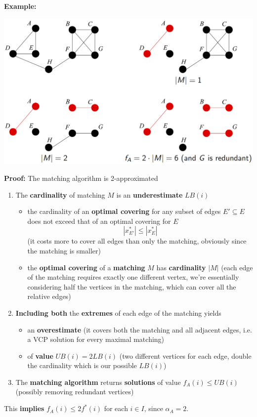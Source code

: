 \documentclass[11pt]{article}
\begin{document}
	\newpage
	
	\textbf{Example:}
	\begin{center}
		\includegraphics[width=\columnwidth]{img/VCP2Approx}
	\end{center}
	
	\textbf{Proof:} The matching algorithm is 2-approximated
	\begin{enumerate}
		\item The \textbf{cardinality} of matching $M$ is an \textbf{underestimate} $LB (i )$
		\begin{itemize}
			\item the cardinality of an \textbf{optimal covering} for any subset of edges $E' \subseteq E$ does not exceed that of an optimal covering for $E$
			$$ |x_{E'}^\ast| \leq |x_E^\ast|$$
			(it costs more to cover all edges than only the matching, obviously since the matching is smaller)
			\item the \textbf{optimal covering} of a \textbf{matching} $M$ has \textbf{cardinality} $|M|$ (each edge of the matching requires exactly one different vertex, we're essentially considering half the vertices in the matching, which can cover all the relative edges)
		\end{itemize}
		\item \textbf{Including both} the \textbf{extremes} of each edge of the matching yields
		\begin{itemize}
			\item an \textbf{overestimate} (it covers both the matching and all adjacent edges, i.e. a VCP solution for every maximal matching)
			\item of \textbf{value} $UB (i ) = 2LB (i )$ (two different vertices for each edge, double the cardinality which is our possible $LB (i)$)
		\end{itemize}
		\item The \textbf{matching algorithm} returns \textbf{solutions} of value $f_A (i ) \leq UB (i )$ (possibly removing redundant vertices)
	\end{enumerate}
	This \textbf{implies} $f_A (i ) \leq 2f^\ast (i )$ for each $i \in I$, since $\alpha_A = 2$.\\
	
\end{document}
